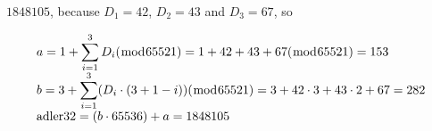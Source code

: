 \begin{Answer}[ref={ex-adler32}]

  $1848105$, because $D_1 = 42$, $D_2 = 43$ and $D_3 = 67$, so


  \begin{equation*}
    \def\between{2mm}
    \begin{array}{l}
      a = 1 +  \displaystyle\sum_{i = 1}^{3}D_i (\bmod{65521}) = 1 + 42 +
      43 + 67 (\bmod{65521}) = 153 \\[\between]
      b = 3 + \displaystyle\sum_{i = 1}^{3}(D_i \cdot (3 + 1 - i))
      (\bmod{65521}) = 3 + 42 \cdot 3 + 43 \cdot 2 + 67  = 282 \\[\between]
      \text{adler32} = (b \cdot 65536) + a = 1848105 \\[\between]
    \end{array}
  \end{equation*}

\end{Answer}